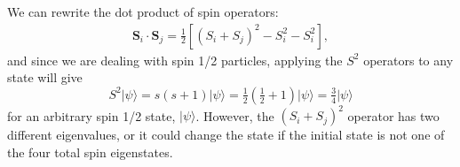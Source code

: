 We can rewrite the dot product of spin operators:
\begin{eqnarray}
\mathbf{S}_i\cdot \mathbf{S}_j = \tfrac{1}{2}\left[ \left(S_i + S_j\right)^2 -S_i^2-S_i^2 \right],
\end{eqnarray}
and since we are dealing with spin 1/2 particles, applying the $S^2$ operators to any state will
give 
\begin{equation}
S^2\lvert \psi\rangle = s(s+1)\lvert \psi \rangle = \tfrac{1}{2}(\tfrac{1}{2} + 1)\lvert \psi \rangle
	= \tfrac{3}{4}\lvert\psi\rangle
\end{equation}
for an arbitrary spin 1/2 state, $\lvert \psi\rangle$.  However, the $\left(S_i + S_j\right)^2$ 
operator has two different eigenvalues, or it could change the state
if the initial state is not one of the four total spin eigenstates.

